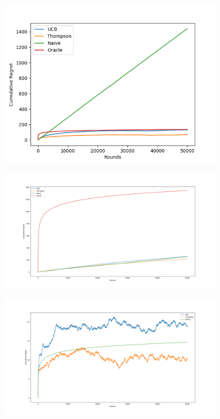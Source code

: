 \documentclass[a4paper]{article}
\begin{document}
\begin{figure}
\centering
\includegraphics[width=1\textwidth]{../img/Regret curves for Bernoulli moderate problem.png}
\caption{\label{fig:Bernoulli_moderate_problem}}
\end{figure}

\begin{figure}
\centering
\includegraphics[width=1\textwidth]{../img/Regret curves for Bernoulli difficult problem.png}
\caption{\label{fig:Bernoulli_difficult_problem}}
\end{figure}

\begin{figure}
\centering
\includegraphics[width=1\textwidth]{../img/Regret curves for Bernoulli easy problem.png}
\caption{\label{fig:Bernoulli_easy_problem}}
\end{figure}
\end{document}
